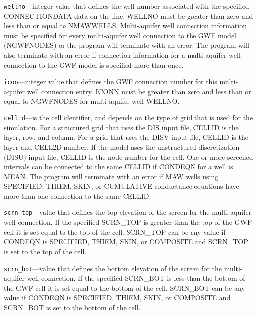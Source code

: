 \begin{description}
\item \texttt{wellno}---integer value that defines the well number associated with the specified CONNECTIONDATA data on the line. WELLNO must be greater than zero and less than or equal to NMAWWELLS. Multi-aquifer well connection information must be specified for every multi-aquifer well connection to the GWF model (NGWFNODES) or the program will terminate with an error.  The program will also terminate with an error if connection information for a multi-aquifer well connection to the GWF model is specified more than once.

\item \texttt{icon}---integer value that defines the GWF connection number for this multi-aquifer well connection entry. ICONN must be greater than zero and less than or equal to NGWFNODES for multi-aquifer well WELLNO.

\item \texttt{cellid}---is the cell identifier, and depends on the type of grid that is used for the simulation.  For a structured grid that uses the DIS input file, CELLID is the layer, row, and column.   For a grid that uses the DISV input file, CELLID is the layer and CELL2D number.  If the model uses the unstructured discretization (DISU) input file, CELLID is the node number for the cell. One or more screened intervals can be connected to the same CELLID if CONDEQN for a well is MEAN. The program will terminate with an error if MAW wells using SPECIFIED, THIEM, SKIN, or CUMULATIVE conductance equations have more than one connection to the same CELLID.

\item \texttt{scrn\_top}---value that defines the top elevation of the screen for the multi-aquifer well connection. If the specified SCRN\_TOP is greater than the top of the GWF cell it is set equal to the top of the cell.  SCRN\_TOP can be any value if CONDEQN is SPECIFIED, THIEM, SKIN, or COMPOSITE and SCRN\_TOP is set to the top of the cell.

\item \texttt{scrn\_bot}---value that defines the bottom elevation of the screen for the multi-aquifer well connection. If the specified SCRN\_BOT is less than the bottom of the GWF cell it is set equal to the bottom of the cell.  SCRN\_BOT can be any value if CONDEQN is SPECIFIED, THIEM, SKIN, or COMPOSITE and SCRN\_BOT is set to the bottom of the cell.


\end{description}
